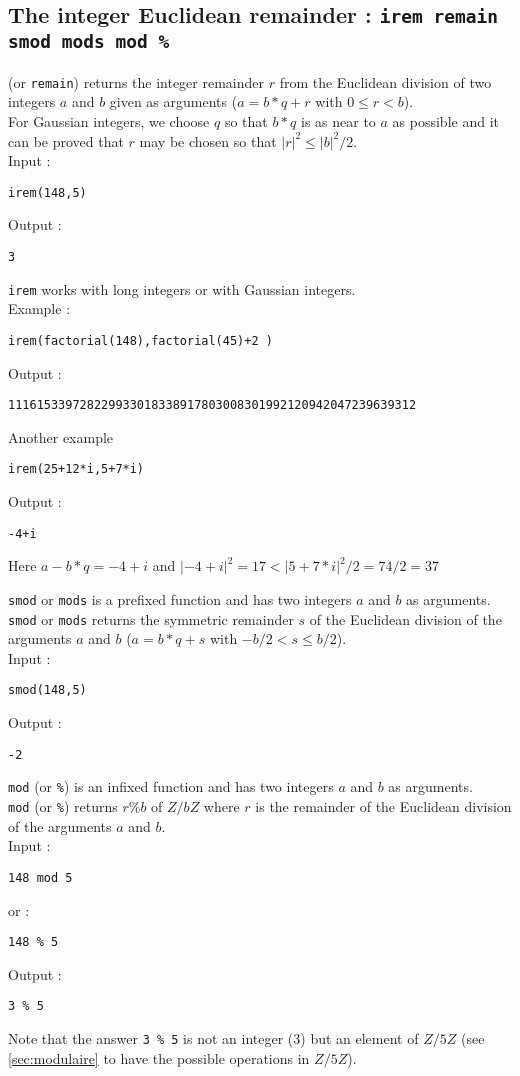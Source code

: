 \documentclass[a4paper,11pt]{book}
\begin{document}
\subsection{The integer  Euclidean remainder : {\tt irem remain smod mods mod \%}}
 (or {\tt remain}) returns the integer remainder  $r$ from 
the Euclidean division of two integers $a$ and $b$ given as arguments 
($a=b*q+r$ with $0\leq r< b$).\\
For Gaussian integers, we choose $q$ so that $b*q$ is as near to $a$ as 
possible and it can be proved that $r$ may be chosen so that 
$|r|^2 \leq |b|^2/2$.\\
Input :
\begin{center}{\tt irem(148,5) }\end{center}
Output :
\begin{center}{\tt 3}\end{center}
{\tt irem}  works with long integers or with Gaussian integers.\\
Example :
\begin{center}{\tt irem(factorial(148),factorial(45)+2 )}\end{center}
Output :
\begin{center}{\tt 111615339728229933018338917803008301992120942047239639312}\end{center}
Another example
\begin{center}{\tt irem(25+12*i,5+7*i) }\end{center}
Output :
\begin{center}{\tt -4+i}\end{center}
Here $a-b*q=-4+i$ and $|-4+i|^2=17<|5+7*i|^2/2=74/2=37$

{\tt smod} or {\tt mods} is a prefixed
function and has two integers $a$ and $b$ as arguments.\\ 
{\tt smod} or {\tt mods} returns the 
symmetric remainder $s$ of the Euclidean division of the 
arguments $a$ and $b$ ($a=b*q+s$ with $-b/2<s \leq b/2$).\\
Input :
\begin{center}{\tt smod(148,5) }\end{center}
Output :
\begin{center}{\tt -2}\end{center}

{\tt mod} (or {\tt \%}) is an infixed function 
and has two integers  $a$ and $b$ 
as arguments.\\
{\tt mod} (or {\tt \%}) returns $r\% b$ of $Z/bZ$ where $r$ is the remainder of 
the Euclidean division of the arguments $a$ and $b$.\\
Input :\index{\%}
\begin{center}{\tt 148\ mod\ 5 }\end{center}
or :
\begin{center}{\tt 148 \%  5 }\end{center}
Output :
\begin{center}{\tt 3 \% 5}\end{center}
Note that the answer {\tt 3 \% 5} is not an integer (3) but
an element of $Z/5Z$ (see \ref{sec:modulaire} to have
the possible operations in  $Z/5Z$).
\end{document}
